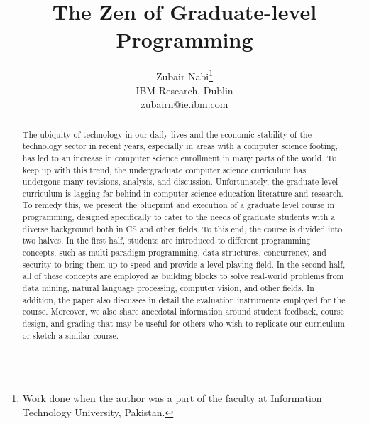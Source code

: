 \documentclass[letterpaper,twocolumn,10pt]{article}
\begin{document}
\title{\Large \bf The Zen of Graduate-level Programming}
\author{
{\rm Zubair Nabi}\thanks{Work done when the author was a part of
the faculty at Information Technology University, Pakistan.}\\
IBM Research, Dublin\\
zubairn@ie.ibm.com
}


\maketitle

\thispagestyle{empty}

\begin{abstract}
The ubiquity of technology in our daily lives and the economic stability of the
technology sector in recent years, especially in areas with a computer science
footing, has led to an increase in computer science enrollment in many parts of
the world. To keep up with this trend, the undergraduate computer science
curriculum has undergone many revisions, analysis, and discussion.
Unfortunately, the graduate level curriculum is lagging far behind in computer
science education literature and research. To remedy this, we present the
blueprint and execution of a graduate level course in programming, designed
specifically to cater to the needs of graduate students with a diverse
background both in CS and other fields. To this end, the course is divided into
two halves. In the first half, students are introduced to different programming
concepts, such as multi-paradigm programming, data structures, concurrency, and
security to bring them up to speed and provide a level playing field. In the
second half, all of these concepts are employed as building blocks to solve
real-world problems from data mining, natural language processing, computer
vision, and other fields. In addition, the paper also discusses in detail the
evaluation instruments employed for the course. Moreover, we also share
anecdotal information around student feedback, course design, and grading that
may be useful for others who wish to replicate our curriculum or sketch a
similar course.
\end{abstract}
\end{document}
